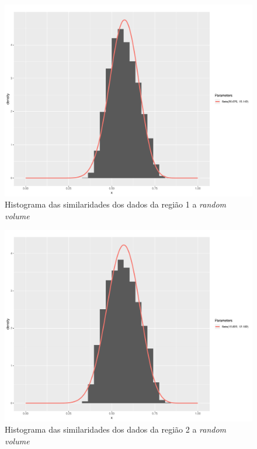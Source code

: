 \documentclass[12pt]{article}
\begin{document}
\begin{figure}[!h]

  \centering
  \includegraphics[width=0.8\linewidth]{../../Figures/Report_19_02_27/hist_rv_beta_region1.pdf}
  \caption{Histograma das similaridades dos dados da região 1 a \textit{random volume}}
  \label{fig:hist_beta_rv1}

\end{figure}

\begin{figure}[!h]

  \centering
  \includegraphics[width=0.8\linewidth]{../../Figures/Report_19_02_27/hist_rv_beta_region2.pdf}
  \caption{Histograma das similaridades dos dados da região 2 a \textit{random volume}}
  \label{fig:hist_beta_rv2}

\end{figure}
\end{document}
